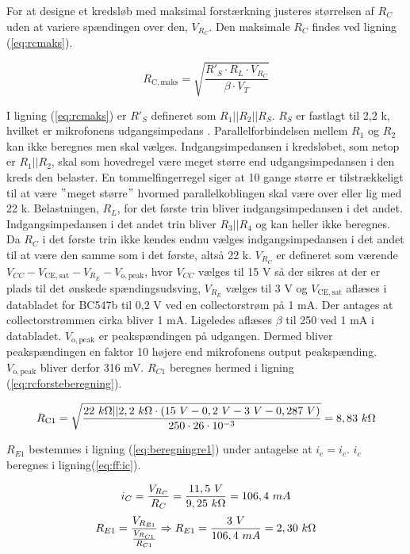For at designe et kredsløb med maksimal forstærkning justeres størrelsen af $R_C$ uden at variere spændingen over den, $V_{R_C}$. Den maksimale $R_C$ findes ved ligning (\ref{eq:rcmaks}).

\begin{equation}
R_{\mathrm{C,maks}} = \sqrt{\frac{R'_S \cdot R_L \cdot V_{R_C}}{\beta \cdot V_T}}
\label{eq:rcmaks}
\end{equation}

I ligning (\ref{eq:rcmaks}) er $R'_S$ defineret som $R_1||R_2||R_S$. $R_S$ er fastlagt til 2,2 k\ohm, hvilket er mikrofonens udgangsimpedans \cite{mic-datablad}. Parallelforbindelsen mellem $R_1$ og $R_2$ kan ikke beregnes men skal vælges. Indgangsimpedansen i kredsløbet, som netop er $R_1||R_2$, skal som hovedregel være meget større end udgangsimpedansen i den kreds den belaster. En tommelfingerregel siger at 10 gange større er tilstrækkeligt til at være $"$meget større$"$ hvormed parallelkoblingen skal være over eller lig med 22 k\ohm. 
Belastningen, $R_L$, for det første trin bliver indgangsimpedansen i det andet. Indgangsimpedansen i det andet trin bliver $R_3||R_4$ og kan heller ikke beregnes. Da $R_C$ i det første trin ikke kendes endnu vælges indgangsimpedansen i det andet til at være den samme som i det første, altså 22 k\ohm. 
$V_{R_C}$ er defineret som værende $V_{CC} - V_{\mathrm{CE,sat}} - V_{R_E} - V_{\mathrm{o,peak}}$, hvor $V_{CC}$ vælges til 15 V så der sikres at der er plads til det ønskede spændingsudsving, $V_{R_E}$ vælges til 3 V og $V_{\mathrm{CE,sat}}$ aflæses i databladet for BC547b \cite{bc547b-datablad} til 0,2 V ved en collectorstrøm på 1 mA. Der antages at collectorstrømmen cirka bliver 1 mA. Ligeledes aflæses $\beta$ til 250 ved 1 mA i databladet. $V_{\mathrm{o,peak}}$ er peakspændingen på udgangen. Dermed bliver peakspændingen en faktor 10 højere end mikrofonens output peakspænding. $V_{\mathrm{o,peak}}$ bliver derfor 316 mV. $R_{C1}$ beregnes hermed i ligning (\ref{eq:rcforsteberegning}).

\begin{equation}
R_{\mathrm{C1}} = \sqrt{\frac{22~k\ohm || 2,2~k\ohm \cdot (15~V - 0,2~V - 3~V - 0,287~V)}{250 \cdot 26 \cdot 10^{-3}}}=8,83~k\ohm
\label{eq:rcforsteberegning}
\end{equation}

$R_{E1}$ bestemmes i ligning (\ref{eq:beregningre1}) under antagelse at $i_e = i_c$.  $i_c$ beregnes i ligning(\ref{eq:ff:ic}).

\begin{equation}
\label{eq:ff:ic}
i_C=\frac{V_{R_C}}{R_C}=\frac{11,5~V}{9,25~k\ohm}=106,4~mA
\end{equation}
\begin{equation}
R_{E1}=\frac{V_{R_{E1}}}{\frac{V_{R_{C1}}}{R_{C1}}}  \Rightarrow R_{E1}=\frac{3~V}{106,4~mA}=2,30~k\ohm
\label{eq:beregningre1}
\end{equation}


